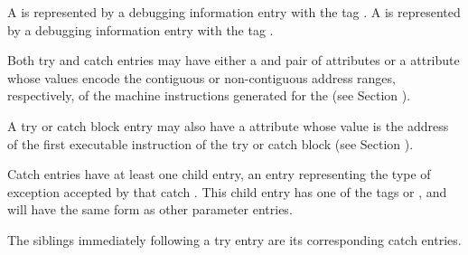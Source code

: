 A  is represented 
by a debugging information entry
with the tag \DWTAGtryblockTARG.  
A  is represented by
a debugging information entry
with the tag \DWTAGcatchblockTARG.

Both try and catch  entries may have either a
\DWATlowpc{} and 
\DWAThighpc{} pair of attributes 
or 
a
\DWATranges{} attribute 
whose values encode the contiguous
or non-contiguous address ranges, respectively, of the
machine instructions generated for the 
(see Section ).

\hypertarget{chap:DWATentrypcoftryblock}{}
\hypertarget{chap:DWATentrypcofcatchblock}{}
A try or catch block entry may also have 
a 
\DWATentrypc{} attribute
whose value is the address of the first executable instruction
of the try or catch block 
(see Section ).

Catch  entries have at least one child entry, 
an entry representing the type of exception accepted by
that catch . 
This child entry has one of the tags
\DWTAGformalparameter{}
or
\DWTAGunspecifiedparameters{},
and will have the same form as other parameter entries.

The siblings immediately following a try  
entry are its corresponding catch  entries.

